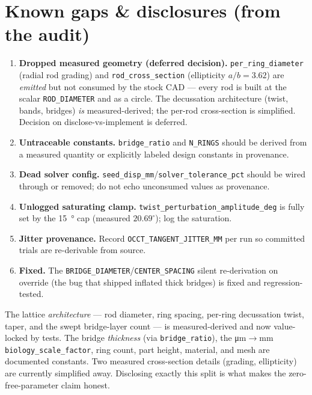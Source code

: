\documentclass[11pt]{article}
\newcommand{\param}[1]{\texttt{#1}}
\begin{document}
\section{Known gaps \& disclosures (from the audit)}
\begin{enumerate}[leftmargin=1.5em]
\item \textbf{Dropped measured geometry (deferred decision).} \param{per\_ring\_diameter}
  (radial rod grading) and \param{rod\_cross\_section} (ellipticity $a/b\!=\!3.62$) are
  \emph{emitted} but not consumed by the stock CAD --- every rod is built at the scalar
  \param{ROD\_DIAMETER} and as a circle. The decussation architecture (twist, bands,
  bridges) \emph{is} measured-derived; the per-rod cross-section is simplified. Decision on
  disclose-vs-implement is deferred.
\item \textbf{Untraceable constants.} \param{bridge\_ratio} and \param{N\_RINGS} should be
  derived from a measured quantity or explicitly labeled design constants in provenance.
\item \textbf{Dead solver config.} \param{seed\_disp\_mm}/\param{solver\_tolerance\_pct} should
  be wired through or removed; do not echo unconsumed values as provenance.
\item \textbf{Unlogged saturating clamp.} \param{twist\_perturbation\_amplitude\_deg} is fully
  set by the \SI{15}{\degree} cap (measured $20.69^\circ$); log the saturation.
\item \textbf{Jitter provenance.} Record \param{OCCT\_TANGENT\_JITTER\_MM} per run so committed
  trials are re-derivable from source.
\item \textbf{Fixed.} The \param{BRIDGE\_DIAMETER}/\param{CENTER\_SPACING} silent re-derivation
  on override (the bug that shipped inflated thick bridges) is fixed and regression-tested.
\end{enumerate}

\begin{notebox}
\small The lattice \emph{architecture} --- rod diameter, ring spacing, per-ring decussation
twist, taper, and the swept bridge-layer count --- is measured-derived and now value-locked by
tests. The bridge \emph{thickness} (via \param{bridge\_ratio}), the \si{\micro\meter}$\to$mm
\param{biology\_scale\_factor}, ring count, part height, material, and mesh are documented
constants. Two measured cross-section details (grading, ellipticity) are currently simplified
away. Disclosing exactly this split is what makes the zero-free-parameter claim honest.
\end{notebox}
\end{document}
